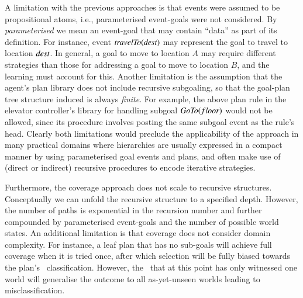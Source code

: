 
A limitation with the previous approaches is that events were assumed to be
propositional atoms, i.e., parameterised event-goals were not considered. By
\emph{parameterised} we mean an event-goal that may contain ``data'' as part of
its definition. For instance, event $\mbox{\textit{travelTo}}(\mbox{\textit{dest}})$ may represent
the goal to travel to location $\mbox{\textit{dest}}$. In general, a goal to move to
location $A$ may require different strategies than those for addressing a goal to
move to location $B$, and the learning must account for this.
Another limitation is the assumption that the agent's plan library does not
include recursive subgoaling, so that the goal-plan tree structure induced is
always \emph{finite}.
For example, the above plan rule in the elevator controller's library for
handling subgoal $\mbox{\textit{GoTo}}(floor)$ would not be allowed, since its procedure
involves posting the same subgoal event as the rule's head.
Clearly both limitations would preclude the applicability of the approach in many
practical domains where hierarchies are usually expressed in a compact manner by
using parameterised goal events and plans, and often make use of (direct or
indirect) recursive procedures to encode iterative strategies.



Furthermore, the coverage approach \cite{Singh:AAMAS10} does not scale
to recursive structures. 
Conceptually we can unfold the recursive structure to a
specified depth. However, the number of paths is exponential in the
recursion number and further compounded by parameterised event-goals
and the number of possible world states.
%
An additional limitation is that coverage does not consider domain
complexity. For instance, a leaf plan that has no sub-goals will
achieve full coverage when it is tried once, after which selection
will be fully biased towards the plan's \dt\ classification. However,
the \dt\ that at this point has only witnessed one world will
generalise the outcome to all as-yet-unseen worlds leading to
misclassification. 

